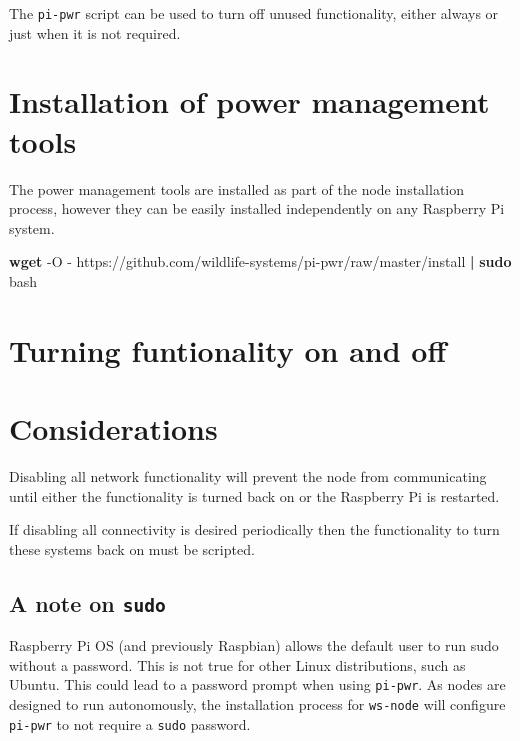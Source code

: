 \documentclass[
]{book}
\newenvironment{Shaded}{\begin{snugshade}}{\end{snugshade}}
\newcommand{\AttributeTok}[1]{\textcolor[rgb]{0.13,0.29,0.53}{#1}}
\newcommand{\FunctionTok}[1]{\textcolor[rgb]{0.13,0.29,0.53}{\textbf{#1}}}
\newcommand{\KeywordTok}[1]{\textcolor[rgb]{0.13,0.29,0.53}{\textbf{#1}}}
\newcommand{\NormalTok}[1]{#1}
\begin{document}
The \texttt{pi-pwr} script can be used to turn off unused functionality, either always or just when it is not required.

\section{Installation of power management tools}\label{installation-of-power-management-tools}

The power management tools are installed as part of the node installation process, however they can be easily installed independently on any Raspberry Pi system.

\begin{Shaded}
\begin{Highlighting}[]
\FunctionTok{wget} \AttributeTok{{-}O} \AttributeTok{{-}}\NormalTok{ https://github.com/wildlife{-}systems/pi{-}pwr/raw/master/install }\KeywordTok{|} \FunctionTok{sudo}\NormalTok{ bash}
\end{Highlighting}
\end{Shaded}

\section{Turning funtionality on and off}\label{turning-funtionality-on-and-off}

\section{Considerations}\label{considerations}

Disabling all network functionality will prevent the node from communicating until either the functionality is turned back on or the Raspberry Pi is restarted.

If disabling all connectivity is desired periodically then the functionality to turn these systems back on must be scripted.

\subsection{\texorpdfstring{A note on \texttt{sudo}}{A note on sudo}}\label{a-note-on-sudo}

Raspberry Pi OS (and previously Raspbian) allows the default user to run sudo without a password. This is not true for other Linux distributions, such as Ubuntu. This could lead to a password prompt when using \texttt{pi-pwr}. As nodes are designed to run autonomously, the installation process for \texttt{ws-node} will configure \texttt{pi-pwr} to not require a \texttt{sudo} password.
\end{document}
